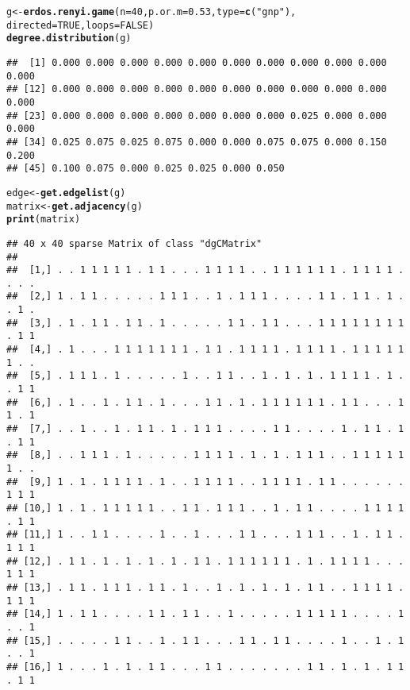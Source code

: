 \documentclass{article}\usepackage[]{graphicx}\usepackage[]{color}
\makeatletter
\newcommand{\hlnum}[1]{\textcolor[rgb]{0.686,0.059,0.569}{#1}}%
\newcommand{\hlstr}[1]{\textcolor[rgb]{0.192,0.494,0.8}{#1}}%
\newcommand{\hlstd}[1]{\textcolor[rgb]{0.345,0.345,0.345}{#1}}%
\newcommand{\hlkwb}[1]{\textcolor[rgb]{0.69,0.353,0.396}{#1}}%
\newcommand{\hlkwc}[1]{\textcolor[rgb]{0.333,0.667,0.333}{#1}}%
\newcommand{\hlkwd}[1]{\textcolor[rgb]{0.737,0.353,0.396}{\textbf{#1}}}%
\newenvironment{kframe}{%
 \def\at@end@of@kframe{}%
 \ifinner\ifhmode%
  \def\at@end@of@kframe{\end{minipage}}%
  \begin{minipage}{\columnwidth}%
 \fi\fi%
 \def\FrameCommand##1{\hskip\@totalleftmargin \hskip-\fboxsep
 \colorbox{shadecolor}{##1}\hskip-\fboxsep
     \hskip-\linewidth \hskip-\@totalleftmargin \hskip\columnwidth}%
 \MakeFramed {\advance\hsize-\width
   \@totalleftmargin\z@ \linewidth\hsize
   \@setminipage}}%
 {\par\unskip\endMakeFramed%
 \at@end@of@kframe}
\newenvironment{knitrout}{}{} %
\makeatother
\begin{document}
\begin{knitrout}
\begin{kframe}
{\ttfamily\noindent\bfseries\color{errorcolor}{\#\# Error: object 'saved.seed' not found}}\begin{alltt}
\hlstd{g} \hlkwb{<-} \hlkwd{erdos.renyi.game}\hlstd{(}\hlkwc{n} \hlstd{=} \hlnum{40}\hlstd{,} \hlkwc{p.or.m} \hlstd{=} \hlnum{0.53}\hlstd{,} \hlkwc{type} \hlstd{=} \hlkwd{c}\hlstd{(}\hlstr{"gnp"}\hlstd{),}
    \hlkwc{directed} \hlstd{=} \hlnum{TRUE}\hlstd{,} \hlkwc{loops} \hlstd{=} \hlnum{FALSE}\hlstd{)}
\hlkwd{degree.distribution}\hlstd{(g)}
\end{alltt}
\begin{verbatim}
##  [1] 0.000 0.000 0.000 0.000 0.000 0.000 0.000 0.000 0.000 0.000 0.000
## [12] 0.000 0.000 0.000 0.000 0.000 0.000 0.000 0.000 0.000 0.000 0.000
## [23] 0.000 0.000 0.000 0.000 0.000 0.000 0.000 0.025 0.000 0.000 0.000
## [34] 0.025 0.075 0.025 0.075 0.000 0.000 0.075 0.075 0.000 0.150 0.200
## [45] 0.100 0.075 0.000 0.025 0.025 0.000 0.050
\end{verbatim}
\begin{alltt}
\hlstd{edge} \hlkwb{<-} \hlkwd{get.edgelist}\hlstd{(g)}
\hlstd{matrix} \hlkwb{<-} \hlkwd{get.adjacency}\hlstd{(g)}
\hlkwd{print}\hlstd{(matrix)}
\end{alltt}
\begin{verbatim}
## 40 x 40 sparse Matrix of class "dgCMatrix"
##                                                                          
##  [1,] . . 1 1 1 1 1 . 1 1 . . . 1 1 1 1 . . 1 1 1 1 1 1 . 1 1 1 1 . . . .
##  [2,] 1 . 1 1 . . . . . 1 1 1 . . 1 . 1 1 1 . . . . 1 1 . 1 1 . 1 . . 1 .
##  [3,] . 1 . 1 1 . 1 1 . 1 . . . . . 1 1 . 1 1 . . . 1 1 1 1 1 1 1 1 . 1 1
##  [4,] . 1 . . . 1 1 1 1 1 1 1 . 1 1 . 1 1 1 1 . 1 1 1 1 . 1 1 1 1 1 1 . .
##  [5,] . 1 1 1 . 1 . . . . . 1 . . 1 1 . . 1 . 1 . 1 . 1 1 1 1 . 1 . . 1 1
##  [6,] . 1 . . 1 . 1 1 . 1 . . . 1 1 . 1 . 1 1 1 1 1 1 . 1 1 . . . 1 1 . 1
##  [7,] . . 1 . . 1 . 1 1 . 1 . 1 1 1 . . . . 1 1 . . . . 1 . 1 1 . 1 . 1 1
##  [8,] . . 1 1 1 . 1 . . . . . 1 1 1 1 . 1 . 1 . 1 1 1 . . 1 1 1 1 1 1 . .
##  [9,] 1 . 1 . 1 1 1 1 . 1 . . 1 1 1 1 . . 1 1 1 1 . 1 1 . . . . . . 1 1 1
## [10,] 1 . 1 . 1 1 1 1 1 . . 1 1 . 1 1 1 . . 1 . 1 1 . . . . 1 1 1 1 . 1 1
## [11,] 1 . . 1 1 . . . . 1 . . 1 . . . 1 1 . . . 1 1 1 . . 1 . 1 1 . 1 1 1
## [12,] . 1 1 . 1 . 1 . 1 . 1 . 1 1 . 1 1 1 1 1 1 . 1 . 1 1 1 1 . . . 1 1 1
## [13,] . 1 1 . 1 1 1 . 1 1 . 1 . . 1 . 1 . 1 . 1 . 1 1 . . 1 1 1 1 . 1 1 1
## [14,] 1 . 1 1 . . . . 1 1 . 1 1 . . 1 . . . . . 1 1 1 1 1 . . . . 1 . . 1
## [15,] . . . . . 1 1 . . 1 . 1 1 . . . 1 1 . 1 1 . . . . 1 . . 1 . 1 . . 1
## [16,] 1 . . . 1 . 1 . 1 1 . . . 1 1 . . . . . . . 1 1 . 1 . 1 . 1 1 . 1 1

\end{verbatim}
\end{kframe}
\end{knitrout}
\end{document}
